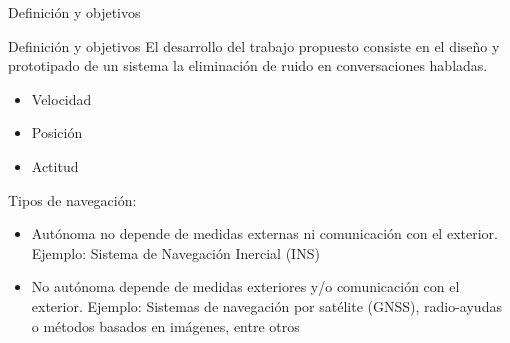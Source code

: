 \begin{frame}{Definición y objetivos}
	\begin{block}{\centering \footnotesize Definición y objetivos}
		El desarrollo del trabajo propuesto consiste en el diseño y prototipado de un sistema la eliminación de ruido en conversaciones habladas.
		\begin{itemize}
			\item Velocidad
			\item Posición
			\item Actitud
		\end{itemize}
	\end{block}
	Tipos de navegación:
	\begin{itemize}
		\item Autónoma  no depende de medidas externas ni comunicación con el exterior. Ejemplo: Sistema de Navegación Inercial (INS)
		\item No autónoma  depende de medidas exteriores y/o comunicación con el exterior. Ejemplo: Sistemas de navegación por satélite (GNSS), radio-ayudas o métodos basados en imágenes, entre otros
	\end{itemize}
\end{frame}